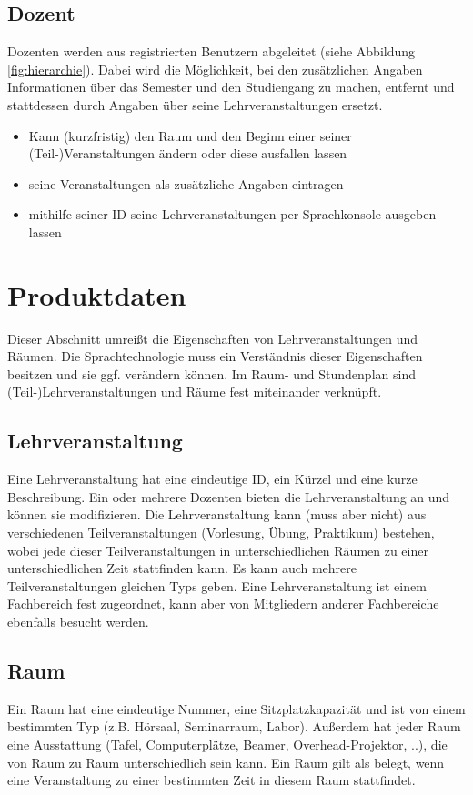 \documentclass[12pt, a4paper]{scrartcl}
\begin{document}
\subsection{Dozent}
Dozenten werden aus registrierten Benutzern abgeleitet (siehe Abbildung \ref{fig:hierarchie}). Dabei wird die Möglichkeit, bei den zusätzlichen Angaben Informationen über das Semester und den Studiengang zu machen, entfernt und stattdessen durch Angaben über seine Lehrveranstaltungen ersetzt.
\begin{itemize}
	\item Kann (kurzfristig) den Raum und den Beginn einer seiner (Teil-)Veranstaltungen ändern oder diese ausfallen lassen
	\item seine Veranstaltungen als zusätzliche Angaben eintragen
	\item mithilfe seiner ID seine Lehrveranstaltungen per Sprachkonsole ausgeben lassen
	\end{itemize}

\newpage

\section{Produktdaten}

Dieser Abschnitt umreißt die Eigenschaften von Lehrveranstaltungen und Räumen. Die Sprachtechnologie muss ein Verständnis dieser Eigenschaften besitzen und sie ggf. verändern können. Im Raum- und Stundenplan sind (Teil-)Lehrveranstaltungen und Räume fest miteinander verknüpft.

\subsection{Lehrveranstaltung}
Eine Lehrveranstaltung hat eine eindeutige ID, ein Kürzel und eine kurze Beschreibung. Ein oder mehrere Dozenten bieten die Lehrveranstaltung an und können sie modifizieren. Die Lehrveranstaltung kann (muss aber nicht) aus verschiedenen Teilveranstaltungen (Vorlesung, Übung, Praktikum) bestehen, wobei jede dieser Teilveranstaltungen in unterschiedlichen Räumen zu einer unterschiedlichen Zeit stattfinden kann. Es kann auch mehrere Teilveranstaltungen gleichen Typs geben. Eine Lehrveranstaltung ist einem Fachbereich fest zugeordnet, kann aber von Mitgliedern anderer Fachbereiche ebenfalls besucht werden.

\subsection{Raum}
Ein Raum hat eine eindeutige Nummer, eine Sitzplatzkapazität und ist von einem bestimmten Typ (z.B. Hörsaal, Seminarraum, Labor). Außerdem hat jeder Raum eine Ausstattung (Tafel, Computerplätze, Beamer, Overhead-Projektor, ..), die von Raum zu Raum unterschiedlich sein kann. Ein Raum gilt als belegt, wenn eine Veranstaltung zu einer bestimmten Zeit in diesem Raum stattfindet.
\end{document}
